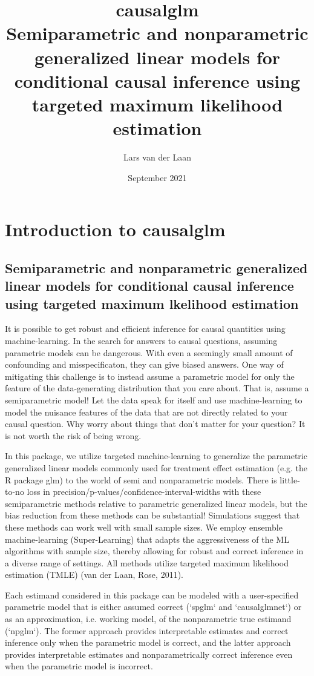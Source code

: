 \documentclass{article}
\title{%
  causalglm \\
  \large Semiparametric and nonparametric generalized linear models for conditional causal inference using targeted maximum likelihood estimation
  }
\author{Lars van der Laan }
\date{September 2021}
\begin{document}


\maketitle



\section{Introduction to causalglm}
\subsection{Semiparametric and nonparametric generalized linear models for conditional causal inference using targeted maximum lkelihood estimation}


It is possible to get robust and efficient inference for causal quantities using machine-learning. In the search for answers to causal questions, assuming parametric models can be dangerous. With even a seemingly small amount of confounding and misspecificaton, they can give biased answers. One way of mitigating this challenge is to instead assume a parametric model for only the feature of the data-generating distribution that you care about. That is, assume a semiparametric model! Let the data speak for itself and use machine-learning to model the nuisance features of the data that are not directly related to your causal question. Why worry about things that don't matter for your question? It is not worth the risk of being wrong.

In this package, we utilize targeted machine-learning to generalize the parametric generalized linear models commonly used for treatment effect estimation (e.g. the R package glm) to the world of semi and nonparametric models. There is little-to-no loss in precision/p-values/confidence-interval-widths with these semiparametric methods relative to parametric generalized linear models, but the bias reduction from these methods can be substantial! Simulations suggest that these methods can work well with small sample sizes. We employ ensemble machine-learning (Super-Learning) that adapts the aggressiveness of the ML algorithms with sample size, thereby allowing for robust and correct inference in a diverse range of settings. All methods utilize targeted maximum likelihood estimation (TMLE) (van der Laan, Rose, 2011).\nocite{vanderLaanRose2011}

Each estimand considered in this package can be modeled with a user-specified parametric model that is either assumed correct (`spglm` and `causalglmnet`) or as an approximation, i.e. working model, of the nonparametric true estimand (`npglm`). The former approach provides interpretable estimates and correct inference only when the parametric model is correct, and the latter approach provides interpretable estimates and nonparametrically correct inference even when the parametric model is incorrect.
\end{document}
